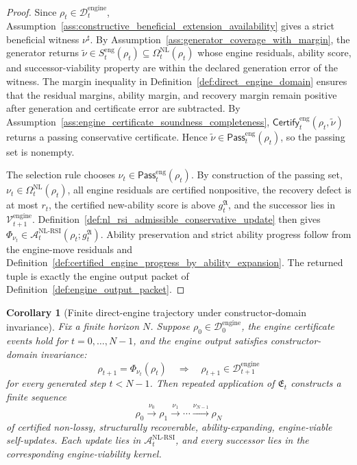\documentclass[11pt]{article}
\newtheorem{corollary}[theorem]{Corollary}
\newcommand{\Acal}{\mathcal{A}}
\newcommand{\1}{\mathbf{1}}
\providecommand{\Dcal}{\mathcal{D}}
\providecommand{\Vcal}{\mathcal{V}}
\begin{document}
\begin{proof}
Since \(\rho_t\in\Dcal_t^{\mathrm{engine}}\), Assumption~\ref{ass:constructive_beneficial_extension_availability} gives a strict beneficial witness \(\nu^\sharp\).  By Assumption~\ref{ass:generator_coverage_with_margin}, the generator returns \(\widetilde\nu\in S_t^{\mathrm{eng}}(\rho_t)\subseteq\Omega_t^{\mathrm{NL}}(\rho_t)\) whose engine residuals, ability score, and successor-viability property are within the declared generation error of the witness.  The margin inequality in Definition~\ref{def:direct_engine_domain} ensures that the residual margins, ability margin, and recovery margin remain positive after generation and certificate error are subtracted.  By Assumption~\ref{ass:engine_certificate_soundness_completeness}, \(\mathsf{Certify}_t^{\mathrm{eng}}(\rho_t,\widetilde\nu)\) returns a passing conservative certificate.  Hence \(\widetilde\nu\in\mathsf{Pass}_t^{\mathrm{eng}}(\rho_t)\), so the passing set is nonempty.

The selection rule chooses \(\nu_t\in\mathsf{Pass}_t^{\mathrm{eng}}(\rho_t)\).  By construction of the passing set, \(\nu_t\in\Omega_t^{\mathrm{NL}}(\rho_t)\), all engine residuals are certified nonpositive, the recovery defect is at most \(r_t\), the certified new-ability score is above \(g_t^{\mathfrak A}\), and the successor lies in \(\Vcal_{t+1}^{\mathrm{engine}}\).  Definition~\ref{def:nl_rsi_admissible_conservative_update} then gives \(\Phi_{\nu_t}\in\Acal_t^{\mathrm{NL\mbox{-}RSI}}(\rho_t;g_t^{\mathfrak A})\).  Ability preservation and strict ability progress follow from the engine-move residuals and Definition~\ref{def:certified_engine_progress_by_ability_expansion}.  The returned tuple is exactly the engine output packet of Definition~\ref{def:engine_output_packet}.
\end{proof}

\begin{corollary}[Finite direct-engine trajectory under constructor-domain invariance]
\label{cor:finite_direct_engine_trajectory}
Fix a finite horizon \(N\).  Suppose \(\rho_0\in\Dcal_0^{\mathrm{engine}}\), the engine certificate events hold for \(t=0,\ldots,N-1\), and the engine output satisfies constructor-domain invariance:
\[
\rho_{t+1}=\Phi_{\nu_t}(\rho_t)
\quad\Longrightarrow\quad
\rho_{t+1}\in\Dcal_{t+1}^{\mathrm{engine}}
\]
for every generated step \(t<N-1\).  Then repeated application of \(\mathfrak E_t\) constructs a finite sequence
\[
\rho_0\xrightarrow{\nu_0}\rho_1\xrightarrow{\nu_1}\cdots\xrightarrow{\nu_{N-1}}\rho_N
\]
of certified non-lossy, structurally recoverable, ability-expanding, engine-viable self-updates.  Each update lies in \(\Acal_t^{\mathrm{NL\mbox{-}RSI}}\), and every successor lies in the corresponding engine-viability kernel.
\end{corollary}
\end{document}
